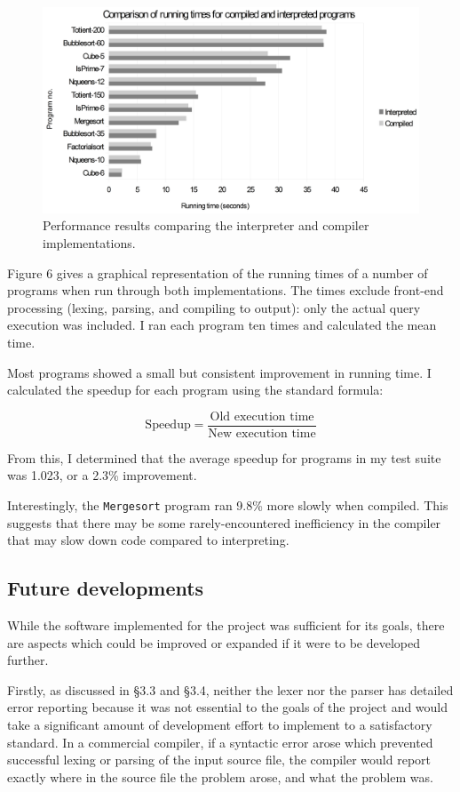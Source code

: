 \documentclass[12pt]{article}
\begin{document}
\begin{figure}
\includegraphics[scale=0.1]{Graph65.png}
\caption{Performance results comparing the interpreter and compiler implementations.}
\end{figure}

Figure 6 gives a graphical representation of the running times of a number of programs when run through both implementations. The times exclude front-end processing (lexing, parsing, and compiling to output): only the actual query execution was included. I ran each program ten times and calculated the mean time.

Most programs showed a small but consistent improvement in running time. I calculated the speedup for each program using the standard formula:

\[ \text{Speedup} = \frac{\text{Old execution time}}{\text{New execution time}} \]

From this, I determined that the average speedup for programs in my test suite was 1.023, or a 2.3\% improvement. 

Interestingly, the \verb|Mergesort| program ran 9.8\% more slowly when compiled. This suggests that there may be some rarely-encountered inefficiency in the compiler that may slow down code compared to interpreting.

\subsection{Future developments}

While the software implemented for the project was sufficient for its goals, there are aspects which could be improved or expanded if it were to be developed further.

Firstly, as discussed in \S3.3 and \S3.4, neither the lexer nor the parser has detailed error reporting because it was not essential to the goals of the project and would take a significant amount of development effort to implement to a satisfactory standard. 
In a commercial compiler, if a syntactic error arose which prevented successful lexing or parsing of the input source file, the compiler would report exactly where in the source file the problem arose, and what the problem was.
\end{document}
